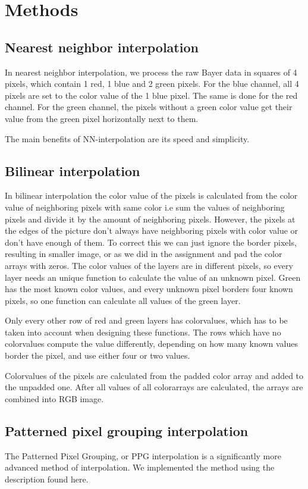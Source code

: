 \section{Methods}

\subsection{Nearest neighbor interpolation}
In nearest neighbor interpolation, we process the raw Bayer data in squares of
4 pixels, which contain 1 red, 1 blue and 2 green pixels. For the blue
channel, all 4 pixels are set to the color value of the 1 blue pixel. The same
is done for the red channel. For the green channel, the pixels without a green
color value get their value from the green pixel horizontally next to them.

The main benefits of NN-interpolation are its speed and simplicity.

\subsection{Bilinear interpolation}

In bilinear interpolation the color value of the pixels is calculated from the
color value of neighboring pixels with same color i.e sum the values of
neighboring pixels and divide it by the amount of neighboring pixels. However,
the pixels at the edges of the picture don't always have neighboring pixels
with color value or don't have enough of them. To correct this we can just
ignore the border pixels, resulting in smaller image, or as we did in the
assignment and pad the color arrays with zeros. The color values of the layers
are in different pixels, so every layer needs an unique function to calculate
the value of an unknown pixel.  Green has the most known color values, and
every unknown pixel borders four known pixels, so one function can calculate
all values of the green layer.

Only every other row of red and green layers has colorvalues, which has to be
taken into account when designing these functions. The rows which have no
colorvalues compute the value differently, depending on how many known values
border the pixel, and use either four or two values.

Colorvalues of the pixels are calculated from the padded color array and added
to the unpadded one. After all values of all colorarrays are calculated, the
arrays are combined into RGB image.

\subsection{Patterned pixel grouping interpolation}
The Patterned Pixel Grouping, or PPG interpolation is a significantly more
advanced method of interpolation. We implemented the method using the
description found here\cite{chuan-kai_lin}.

